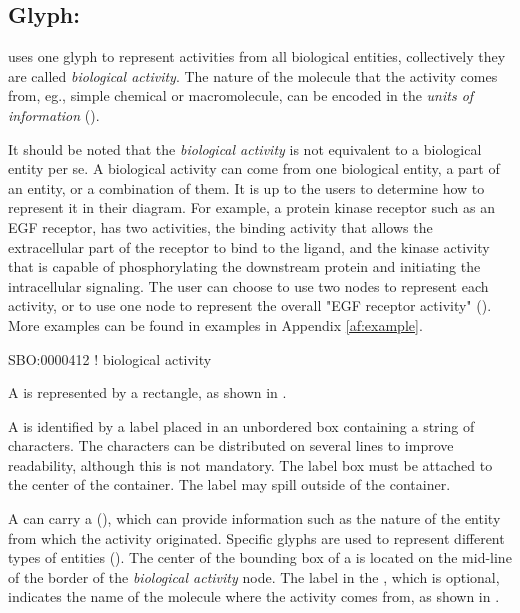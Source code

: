 \subsection{Glyph: }
\label{sec:af:biologicalActivity}

\SBGNAFLone uses one glyph to represent activities from all biological entities, collectively they are called \emph{biological activity}. The nature of the molecule that the activity comes from, eg., simple chemical or macromolecule, can be encoded in the \emph{units of information} ().

It should be noted that the \emph{biological activity} is not equivalent to a biological entity per se.  A biological activity can come from one biological entity, a part of an entity, or a combination of  them.  It is up to the users to determine how to represent it in their diagram.  For example, a protein kinase receptor such as an EGF receptor, has two activities, the binding activity that allows the extracellular part of the receptor to bind to the ligand, and the kinase activity that is capable of phosphorylating the downstream protein and initiating the intracellular signaling.  The user can choose to use two nodes to represent each activity, or to use one node to represent the overall "EGF receptor activity" ().  More examples can be found in examples in Appendix \ref{af:example}.

\begin{glyphDescription}

\glyphSboTerm SBO:0000412 ! biological activity

\glyphContainer A  is represented by a rectangle, as shown in .

\glyphLabel A  is identified by a label placed in an unbordered box containing a string of characters.  The characters can be distributed on several lines to improve readability, although this is not mandatory.  The label box must be attached to the center of the container.  The label may spill outside of the container.

\glyphAux A  can carry a  (), which can provide information such as the nature of the entity from which the activity originated.  Specific glyphs are used to represent different types of entities ().  The center of the bounding box of a  is located on the mid-line of the border of the \emph{biological activity} node.  The label in the , which is optional, indicates the name of the molecule where the activity comes from, as shown in .

\end{glyphDescription}

